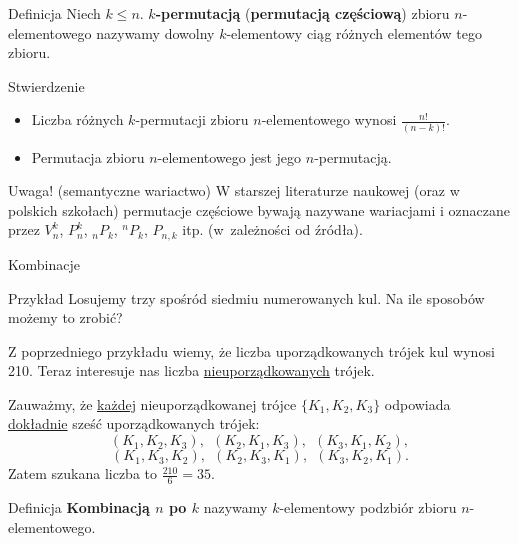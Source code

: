 \documentclass[a4paper,10pt]{beamer}
\begin{document}
\begin{frame}

		\begin{block}{Definicja}
		Niech $k\leq n$. {\bf $k$-permutacją} ({\bf permutacją częściową}) zbioru $n$-elementowego nazywamy dowolny $k$-elementowy ciąg różnych elementów tego zbioru. 
	\end{block}
	
	\begin{block}{Stwierdzenie}
		\begin{itemize}
		\item Liczba różnych $k$-permutacji zbioru $n$-elementowego wynosi $\displaystyle \frac{n!}{(n-k)!}$.
		\item Permutacja zbioru $n$-elementowego jest jego $n$-permutacją.
		\end{itemize}
	\end{block}

	\begin{alertblock}{Uwaga! (semantyczne wariactwo)}
		W starszej literaturze naukowej (oraz w polskich szkołach) permutacje częściowe bywają nazywane wariacjami i oznaczane przez $V_n^k$, $P_n^k$, ${}_nP_k$, ${}^nP_k$, $P_{n,k}$ itp. (w~zależności od źródła).
	\end{alertblock}
	
\end{frame}



\begin{frame}{Kombinacje}
	
	\begin{exampleblock}{Przykład}
		Losujemy trzy spośród siedmiu numerowanych kul. Na ile sposobów możemy to zrobić?
		
		\vspace{0.3cm}
		Z poprzedniego przykładu wiemy, że liczba uporządkowanych trójek kul wynosi 210. Teraz interesuje nas liczba \underline{nieuporządkowanych} trójek.
		
		Zauważmy, że \underline{każdej} nieuporządkowanej trójce $\{K_1,K_2,K_3\}$ odpowiada \underline{dokładnie} sześć uporządkowanych trójek:
		$$(K_1,K_2,K_3),\ \ (K_2,K_1,K_3),\ \ (K_3,K_1,K_2),$$ $$(K_1,K_3,K_2),\ \ (K_2,K_3,K_1),\ \ (K_3,K_2,K_1).$$
		Zatem szukana liczba to $\displaystyle \frac{210}6=35$.
	\end{exampleblock}
	
\begin{block}{Definicja}
{\bf Kombinacją $n$ po $k$} nazywamy $k$-elementowy podzbiór zbioru $n$-elementowego. 
\end{block}

	
\end{frame}
\end{document}

